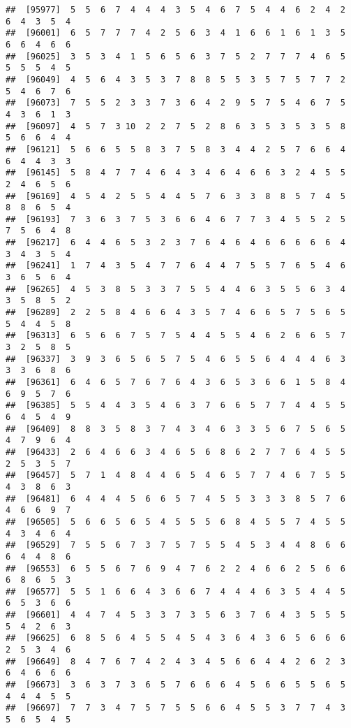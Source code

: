 \documentclass[
]{book}
\begin{document}
\begin{verbatim}
##  [95977]  5  5  6  7  4  4  4  3  5  4  6  7  5  4  4  6  2  4  2  6  4  3  5  4
##  [96001]  6  5  7  7  7  4  2  5  6  3  4  1  6  6  1  6  1  3  5  6  6  4  6  6
##  [96025]  3  5  3  4  1  5  6  5  6  3  7  5  2  7  7  7  4  6  5  5  5  5  4  5
##  [96049]  4  5  6  4  3  5  3  7  8  8  5  5  3  5  7  5  7  7  2  5  4  6  7  6
##  [96073]  7  5  5  2  3  3  7  3  6  4  2  9  5  7  5  4  6  7  5  4  3  6  1  3
##  [96097]  4  5  7  3 10  2  2  7  5  2  8  6  3  5  3  5  3  5  8  5  6  6  4  4
##  [96121]  5  6  6  5  5  8  3  7  5  8  3  4  4  2  5  7  6  6  4  6  4  4  3  3
##  [96145]  5  8  4  7  7  4  6  4  3  4  6  4  6  6  3  2  4  5  5  2  4  6  5  6
##  [96169]  4  5  4  2  5  5  4  4  5  7  6  3  3  8  8  5  7  4  5  8  8  6  5  4
##  [96193]  7  3  6  3  7  5  3  6  6  4  6  7  7  3  4  5  5  2  5  7  5  6  4  8
##  [96217]  6  4  4  6  5  3  2  3  7  6  4  6  4  6  6  6  6  6  4  3  4  3  5  4
##  [96241]  1  7  4  3  5  4  7  7  6  4  4  7  5  5  7  6  5  4  6  3  6  5  6  4
##  [96265]  4  5  3  8  5  3  3  7  5  5  4  4  6  3  5  5  6  3  4  3  5  8  5  2
##  [96289]  2  2  5  8  4  6  6  4  3  5  7  4  6  6  5  7  5  6  5  5  4  4  5  8
##  [96313]  6  5  6  6  7  5  7  5  4  4  5  5  4  6  2  6  6  5  7  3  2  5  8  5
##  [96337]  3  9  3  6  5  6  5  7  5  4  6  5  5  6  4  4  4  6  3  3  3  6  8  6
##  [96361]  6  4  6  5  7  6  7  6  4  3  6  5  3  6  6  1  5  8  4  6  9  5  7  6
##  [96385]  5  5  4  4  3  5  4  6  3  7  6  6  5  7  7  4  4  5  5  6  4  5  4  9
##  [96409]  8  8  3  5  8  3  7  4  3  4  6  3  3  5  6  7  5  6  5  4  7  9  6  4
##  [96433]  2  6  4  6  6  3  4  6  5  6  8  6  2  7  7  6  4  5  5  2  5  3  5  7
##  [96457]  5  7  1  4  8  4  4  6  5  4  6  5  7  7  4  6  7  5  5  4  3  8  6  3
##  [96481]  6  4  4  4  5  6  6  5  7  4  5  5  3  3  3  8  5  7  6  4  6  6  9  7
##  [96505]  5  6  6  5  6  5  4  5  5  5  6  8  4  5  5  7  4  5  5  4  3  4  6  4
##  [96529]  7  5  5  6  7  3  7  5  7  5  5  4  5  3  4  4  8  6  6  6  4  4  8  6
##  [96553]  6  5  5  6  7  6  9  4  7  6  2  2  4  6  6  2  5  6  6  6  8  6  5  3
##  [96577]  5  5  1  6  6  4  3  6  6  7  4  4  4  6  3  5  4  4  5  6  5  3  6  6
##  [96601]  4  4  7  4  5  3  3  7  3  5  6  3  7  6  4  3  5  5  5  5  4  2  6  3
##  [96625]  6  8  5  6  4  5  5  4  5  4  3  6  4  3  6  5  6  6  6  2  5  3  4  6
##  [96649]  8  4  7  6  7  4  2  4  3  4  5  6  6  4  4  2  6  2  3  6  4  6  6  6
##  [96673]  3  6  3  7  3  6  5  7  6  6  6  4  5  6  6  5  5  6  5  4  4  4  5  5
##  [96697]  7  7  3  4  7  5  7  5  5  6  6  4  5  5  3  7  7  4  3  5  6  5  4  5

\end{verbatim}
\end{document}
